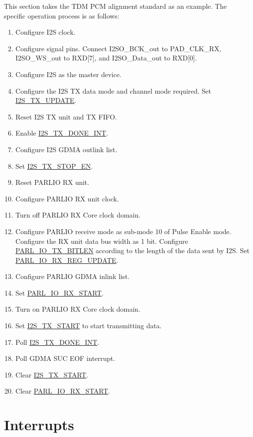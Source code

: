 \documentclass[main\_\_EN.tex]{subfiles}
\begin{document}
This section takes the TDM PCM alignment standard as an example. The specific operation process is as follows:
\begin{enumerate}
    \item Configure I2S clock.
    \item Configure signal pins. Connect I2SO\_BCK\_out to PAD\_CLK\_RX, I2SO\_WS\_out to RXD[7], and I2SO\_Data\_out to RXD[0].
    \item Configure I2S as the master device.
    \item Configure the I2S TX data mode and channel mode required. Set \hyperref[fielddesc:I2STXUPDATE]{I2S\_TX\_UPDATE}.
    \item Reset I2S TX unit and TX FIFO.
    \item Enable \hyperref[int:I2STXDONEINT]{I2S\_TX\_DONE\_INT}. 
    \item Configure I2S GDMA outlink list.
    \item Set \hyperref[fielddesc:I2STXSTOPEN]{I2S\_TX\_STOP\_EN}.
    \item Reset PARLIO RX unit.
    \item Configure PARLIO RX unit clock.
    \item Turn off PARLIO RX Core clock domain.
    \item Configure PARLIO receive mode as sub-mode 10 of Pulse Enable mode. Configure the RX unit data bus width as 1 bit. Configure \hyperref[fielddesc:PARLIOTXBITLEN]{PARL\_IO\_TX\_BITLEN} according to the length of the data sent by I2S. Set \hyperref[fielddesc:PARLIORXREGUPDATE]{PARL\_IO\_RX\_REG\_UPDATE}.
    \item Configure PARLIO GDMA inlink list.
    \item Set \hyperref[fielddesc:PARLIORXSTART]{PARL\_IO\_RX\_START}.
    \item Turn on PARLIO RX Core clock domain.
    \item Set \hyperref[fielddesc:I2STXSTART]{I2S\_TX\_START} to start transmitting data.
    \item Poll \hyperref[int:I2STXDONEINT]{I2S\_TX\_DONE\_INT}. 
    \item Poll GDMA SUC EOF interrupt.
    \item Clear \hyperref[fielddesc:I2STXSTART]{I2S\_TX\_START}.
    \item Clear \hyperref[fielddesc:PARLIORXSTART]{PARL\_IO\_RX\_START}.
\end{enumerate}

\section{Interrupts} \label{sec:parlio-interrupts}
\end{document}

